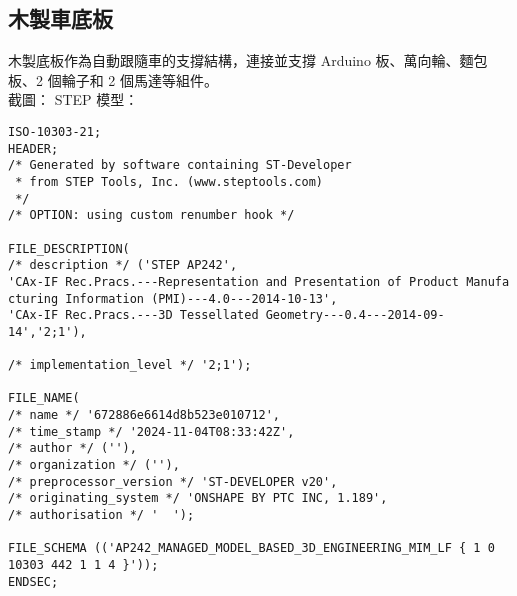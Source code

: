 \documentclass[a4paper,12pt]{article}
\begin{document}
\begin{lstlising}[language=C++]
\subsection{木製車底板}
木製底板作為自動跟隨車的支撐結構，連接並支撐 Arduino 板、萬向輪、麵包板、2 個輪子和 2 個馬達等組件。\\
截圖：
\bct\bfH\ctr
{}
\ef\FB\ect
STEP 模型：
\begin{lstlisting}[language=STEP]
ISO-10303-21;
HEADER;
/* Generated by software containing ST-Developer
 * from STEP Tools, Inc. (www.steptools.com) 
 */
/* OPTION: using custom renumber hook */

FILE_DESCRIPTION(
/* description */ ('STEP AP242',
'CAx-IF Rec.Pracs.---Representation and Presentation of Product Manufa
cturing Information (PMI)---4.0---2014-10-13',
'CAx-IF Rec.Pracs.---3D Tessellated Geometry---0.4---2014-09-14','2;1'),

/* implementation_level */ '2;1');

FILE_NAME(
/* name */ '672886e6614d8b523e010712',
/* time_stamp */ '2024-11-04T08:33:42Z',
/* author */ (''),
/* organization */ (''),
/* preprocessor_version */ 'ST-DEVELOPER v20',
/* originating_system */ 'ONSHAPE BY PTC INC, 1.189',
/* authorisation */ '  ');

FILE_SCHEMA (('AP242_MANAGED_MODEL_BASED_3D_ENGINEERING_MIM_LF { 1 0 10303 442 1 1 4 }'));
ENDSEC;


\end{lstlisting}
\end{lstlising}
\end{document}
